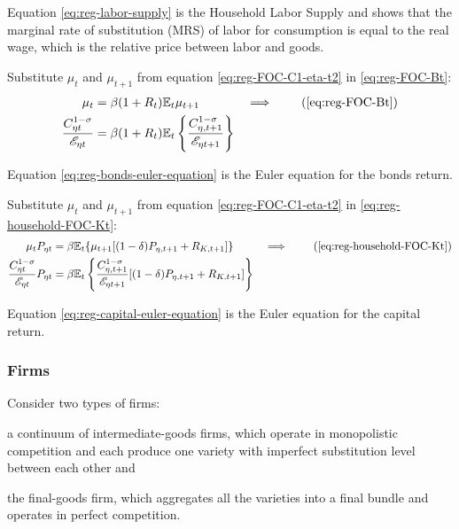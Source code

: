\documentclass[
thesis.tex
]{subfiles}
\begin{document}
Equation \ref{eq:reg-labor-supply} is the Household Labor Supply and shows that the marginal rate of substitution (MRS) of labor for consumption is equal to the real wage, which is the relative price between labor and goods.

Substitute $\mu_t$ and $\mu_{t+1}$ from equation \ref{eq:reg-FOC-C1-eta-t2} in \ref{eq:reg-FOC-Bt}:
\begin{alignat}{2}
	\mu_t &= \beta (1 + R_{t}) \E{ \mu_{t+1}} &\implies \tag{\ref{eq:reg-FOC-Bt}} 
	\\
	\frac{ C_{\eta t}^{1-\sigma}}{ \te} &= \beta (1 + R_{t}) \E \left\{ \frac{ C_{\eta, t+1}^{1-\sigma}}{ \te[t+1]} \right\} \label{eq:reg-bonds-euler-equation}
\end{alignat}

Equation \ref{eq:reg-bonds-euler-equation} is the Euler equation for the bonds return.

Substitute $\mu_t$ and $\mu_{t+1}$ from equation \ref{eq:reg-FOC-C1-eta-t2} in \ref{eq:reg-household-FOC-Kt}:
\begin{alignat}{2}
	\mu_t P_{\eta t} &= \beta \mathbb{E}_t \{ \mu_{t+1} [(1-\delta) P_{\eta, t+1} + R_{K,t+1}] \} &\implies \tag{\ref{eq:reg-household-FOC-Kt}} 
	\\
	\frac{ C_{\eta t}^{1-\sigma}}{ \te} P_{\eta t} &= \beta \mathbb{E}_t \left\{ \frac{ C_{\eta, t+1}^{1-\sigma}}{ \te[t+1]} [(1-\delta) P_{\eta, t+1} + R_{K,t+1}] \right\} \label{eq:reg-capital-euler-equation}
\end{alignat}

Equation \ref{eq:reg-capital-euler-equation} is the Euler equation for the capital return.


\subsubsection*{Firms}

Consider two types of firms: 
\begin{enumerate*}[label=(\arabic*)]
	\item a continuum of intermediate-goods firms, which operate in monopolistic competition and each produce one variety with imperfect substitution level between each other and
	
	\item the final-goods firm, which aggregates all the varieties into a final bundle and operates in perfect competition.
\end{enumerate*}
\end{document}

